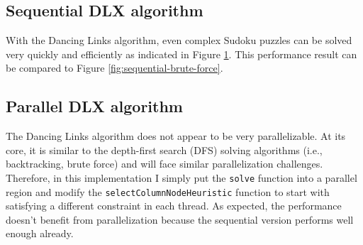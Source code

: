 \documentclass[12pt,a4paper]{article}
\newcommand{\code}[1]{\colorbox{light-gray}{\texttt{#1}}}
\begin{document}
	\subsection{Sequential DLX algorithm}
		With the Dancing Links algorithm, even complex Sudoku puzzles can be solved
		very quickly and efficiently as indicated in Figure \ref{fig:sequential-dlx}.
		This performance result can be compared to Figure \ref{fig:sequential-brute-force}.
		\begin{figure}[H]
			\centering
			\caption{}
			\label{fig:sequential-dlx}
		\end{figure}

	\subsection{Parallel DLX algorithm}
	The Dancing Links algorithm does not appear to be very parallelizable.
	At its core, it is similar to the depth-first search (DFS) solving algorithms (i.e., backtracking, brute force)
	and will face similar parallelization challenges.
	Therefore, in this implementation I simply put the \code{solve} function into a parallel region and
	modify the \code{selectColumnNodeHeuristic} function to start with satisfying a different constraint in each thread.
	As expected, the performance doesn't benefit from parallelization because the sequential version performs well enough already.


\end{document}
